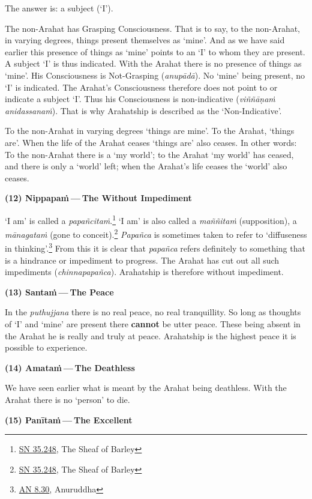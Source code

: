 The answer is: a subject (`I').

The non-Arahat has Grasping Consciousness. That is to say, to the non-Arahat, in varying degrees, things present themselves as `mine'. And as we have said earlier this presence of things as `mine' points to an `I' to whom they are present. A subject `I' is thus indicated. With the Arahat there is no presence of things as `mine'. His Consciousness is Not-Grasping (\emph{anupādā}). No `mine' being present, no `I' is indicated. The Arahat's Consciousness therefore does not point to or indicate a subject `I'. Thus his Consciousness is non-indicative (\emph{viññāṇaṁ anidassanaṁ}). That is why Arahatship is described as the `Non-Indicative'.

To the non-Arahat in varying degrees `things are mine'. To the Arahat, `things are'. When the life of the Arahat ceases `things are' also ceases. In other words: To the non-Arahat there is a `my world'; to the Arahat `my world' has ceased, and there is only a `world' left; when the Arahat's life ceases the `world' also ceases.

\textbf{(12) Nippapaṁ --- The Without Impediment}

`I am' is called a \emph{papañcitaṁ}.\footnote{\href{https://suttacentral.net/sn35.248/en/bodhi}{SN 35.248}, The Sheaf of Barley} `I am' is also called a \emph{maññitaṁ} (supposition), a \emph{mānagataṁ} (gone to conceit).\footnote{\href{https://suttacentral.net/sn35.248/en/bodhi}{SN 35.248}, The Sheaf of Barley} \emph{Papañca} is sometimes taken to refer to `diffuseness in thinking'.\footnote{\href{https://suttacentral.net/an8.30/en/bodhi}{AN 8.30}, Anuruddha} From this it is clear that \emph{papañca} refers definitely to something that is a hindrance or impediment to progress. The Arahat has cut out all such impediments (\emph{chinnapapañca}). Arahatship is therefore without impediment.

\textbf{(13) Santaṁ --- The Peace}

In the \emph{puthujjana} there is no real peace, no real tranquillity. So long as thoughts of `I' and `mine' are present there \textbf{cannot} be utter peace. These being absent in the Arahat he is really and truly at peace. Arahatship is the highest peace it is possible to experience.

\textbf{(14) Amataṁ --- The Deathless}

We have seen earlier what is meant by the Arahat being deathless. With the Arahat there is no `person' to die.

\textbf{(15) Panītaṁ --- The Excellent}

